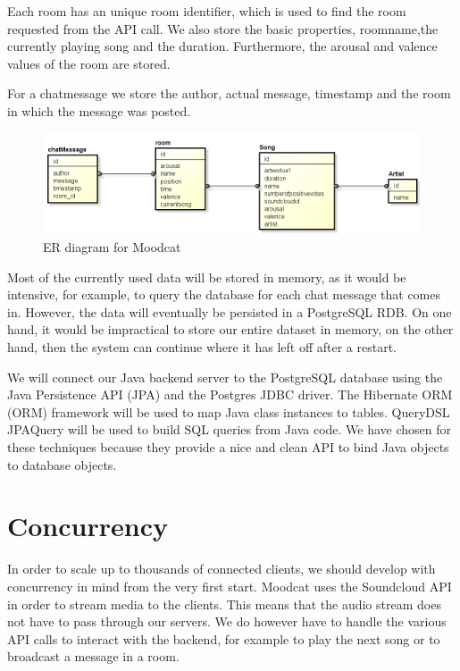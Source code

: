 \par 
Each room has an unique room identifier, which is used to find the room requested from the API call.
We also store the basic properties, roomname,the currently playing song and the duration.
Furthermore, the arousal and valence values of the room are stored.

\par
For a chatmessage we store the author, actual message, timestamp and the room in which the message was posted.

\begin{figure}[H]
\includegraphics[scale=.6]{erDiagram.png}
\caption{ER diagram for Moodcat}
\label{fig:ER diagram of the described entities}
\end{figure}

\par
Most of the currently used data will be stored in memory, as it would be intensive, for example, to query the database for each chat message that comes in.
However, the data will eventually be persisted in a PostgreSQL\cite{PostgreSQL} \gls{RDB}.
On one hand, it would be impractical to store our entire dataset in memory, on the other hand, then the system can continue where it has left off after a restart.

\par
We will connect our Java backend server to the PostgreSQL database using the Java Persistence API (JPA) and the Postgres JDBC driver.
The Hibernate\cite{HibernateORM} \Gls{ORM} (ORM) framework will be used to map Java class instances to tables.
QueryDSL\cite{QueryDSL} JPAQuery will be used to build \Gls{SQL} queries from Java code.
We have chosen for these techniques because they provide a nice and clean API to bind Java objects to database objects.

\section{Concurrency}
In order to scale up to thousands of connected clients, we should develop with concurrency in mind from the very first start.
Moodcat uses the \gls{Soundcloud} API in order to stream media to the clients.
This means that the audio stream does not have to pass through our servers.
We do however have to handle the various API calls to interact with the backend, for example to play the next song or to broadcast a message in a room.

